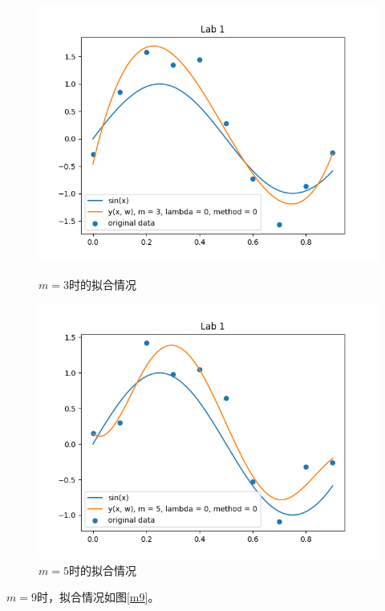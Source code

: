 \begin{figure}[htbp]
    \begin{minipage}[t]{0.5\linewidth}
        \centering
        \includegraphics[width=\textwidth]{figures/Figure_2.png}
        \caption{$m = 3$时的拟合情况}
        \label{m3}
    \end{minipage}
    \begin{minipage}[t]{0.5\linewidth}
        \centering
        \includegraphics[width=\textwidth]{figures/Figure_3.png}
        \caption{$m = 5$时的拟合情况}
        \label{m5}
    \end{minipage}
\end{figure}

$m = 9$时，拟合情况如图\ref{m9}。

